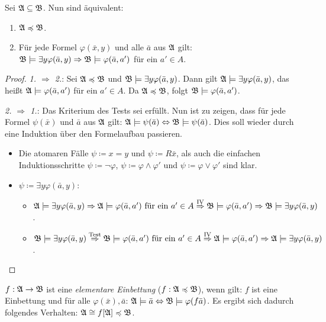 \begin{satz}
	Sei $\mathfrak{A}\subseteq\mathfrak{B}$. Nun sind äquivalent:
	\begin{enumerate}
		\item $\mathfrak{A}\preccurlyeq \mathfrak{B}$.
		\item Für jede Formel $\varphi(\bar{x},y)$ und alle $\bar{a}$ aus $\mathfrak{A}$ gilt: $\mathfrak{B}\models \exists y \varphi(\bar{a},y)\Rightarrow \mathfrak{B}\models\varphi(\bar{a},a')$ für ein $a'\in A$.
	\end{enumerate}
\end{satz}
\begin{proof}
	\textit{1. $\Rightarrow$ 2.}: Sei $\mathfrak{A}\preccurlyeq\mathfrak{B}$ und $\mathfrak{B}\models\exists y \varphi(\bar{a},y)$. Dann gilt $\mathfrak{A}\models\exists y \varphi(\bar{a},y)$, das heißt $\mathfrak{A}\models\varphi(\bar{a},a')$ für ein $a'\in A$. Da $\mathfrak{A}\preccurlyeq\mathfrak{B}$, folgt $\mathfrak{B}\models\varphi(\bar{a},a')$.
	
	\textit{2. $\Rightarrow$ 1.}: Das Kriterium des Tests sei erfüllt. Nun ist zu zeigen, dass für jede Formel $\psi(\bar{x})$ und $\bar{a}$ aus $\mathfrak{A}$ gilt: $\mathfrak{A}\models\psi(\bar{a})\Leftrightarrow \mathfrak{B}\models\psi(\bar{a})$. Dies soll wieder durch eine Induktion über den Formelaufbau passieren.
	
	\begin{itemize}
		\item Die atomaren Fälle $\psi\coloneqq x=y$ und $\psi\coloneqq R\bar{x}$, als auch die einfachen Induktionsschritte $\psi\coloneqq \neg\varphi$, $\psi\coloneqq\varphi\land\varphi'$ und $\psi\coloneqq \varphi\lor\varphi'$ sind klar.
		
		\item $\psi\coloneqq\exists y \varphi(\bar{a},y)$:
		\begin{itemize}
			\item $\mathfrak{A}\models\exists y\varphi(\bar{a},y)
			\Rightarrow \mathfrak{A}\models\varphi(\bar{a},a')\text{ für ein } a'\in A
			\overset{\text{IV}}{\Rightarrow}\mathfrak{B}\models\varphi(\bar{a},a')
			\Rightarrow\mathfrak{B}\models\exists y \varphi(\bar{a},y)$.
			
			\item $\mathfrak{B}\models\exists y\varphi(\bar{a},y)
			\overset{\text{Test}}{\Rightarrow} \mathfrak{B}\models\varphi(\bar{a},a')\text{ für ein } a'\in A
			\overset{\text{IV}}{\Rightarrow}\mathfrak{A}\models\varphi(\bar{a},a')
			\Rightarrow\mathfrak{A}\models\exists y\varphi(\bar{a},y)$.
		\end{itemize}
	\end{itemize}
\end{proof}

\begin{definition}
	$f:\mathfrak{A}\to\mathfrak{B}$ ist eine \textit{elementare Einbettung} ($f:\mathfrak{A}\preccurlyeq\mathfrak{B}$), wenn gilt: $f$ ist eine Einbettung und für alle $\varphi(\bar{x}),\bar{a}$: $\mathfrak{A}\models\bar{a}\Leftrightarrow\mathfrak{B}\models\varphi(f\bar{a})$. Es ergibt sich dadurch folgendes Verhalten: $\mathfrak{A}\cong f[\mathfrak{A}]\preccurlyeq\mathfrak{B}$.
\end{definition}

